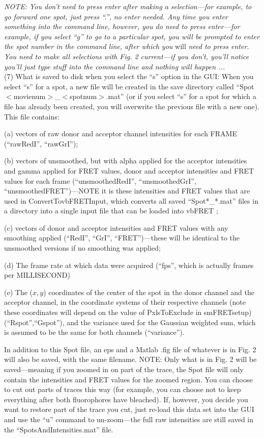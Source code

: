 \documentclass[11pt]{article}
\begin{document}
{\it NOTE: You don't need to press enter after making a selection---for example, to go forward one spot, just press ``.'', no enter needed.  Any time you enter something into the command line, however, you do need to press enter---for example, if you select ``g'' to go to a particular spot, you will be prompted to enter the spot number in the command line, after which you } will {\it need to press enter.  You need to make all selections with Fig. 2 current---if you don't, you'll notice you'll just type stuff into the command line and nothing will happen ... }\\

\noindent (7) What is saved to disk when you select the ``s''  option in the GUI: When you select ``s'' for a spot, a new file will be created in the save directory called ``Spot$<$movienum$>$\_$<$spotnum$>$.mat'' (or if you select ``s'' for a spot for which a file has already been created, you will overwrite the previous file with a new one).  This file contains: 

(a) vectors of raw donor and acceptor channel intensities for each FRAME (``rawRedI'', ``rawGrI''); 

(b) vectors of unsmoothed, but with alpha applied for the acceptor intensities and gamma applied for FRET values, donor and acceptor intensities and FRET values for each frame (``unsmoothedRedI'', ``unsmoothedGrI'', ``unsmoothedFRET'')---NOTE it is these intensities and FRET values that are used in ConvertTovbFRETInput, which converts all saved ``Spot*\_*.mat'' files in a directory into a single input file that can be loaded into vbFRET \cite{Bronson2009};

(c) vectors of donor and acceptor intensities and FRET values with any smoothing applied (``RedI'', ``GrI'', ``FRET'')---these will be identical to the unsmoothed versions if no smoothing was applied;

(d) The frame rate at which data were acquired (``fps'', which is actually frames per MILLISECOND)

(e) The ($x,y$) coordinates of the center of the spot in the donor channel and the acceptor channel, in the coordinate systems of their respective channels (note these coordinates will depend on the value of PxlsToExclude in smFRETsetup) (``Rspot'',``Gspot''), and the variance used for the Gaussian weighted sum, which is assumed to be the same for both channels (``variance'').

In addition to this Spot file, an eps and a Matlab .fig file of whatever is in Fig. 2 will also be saved, with the same filename.  NOTE: Only what is in Fig. 2 will be saved---meaning if you zoomed in on part of the trace, the Spot file will only contain the intensities and FRET values for the zoomed region.  You can choose to cut out parts of traces this way (for example, you can choose not to keep everything after both fluorophores have bleached).  If, however, you decide you want to restore part of the trace you cut, just re-load this data set into the GUI and use the ``u'' command to un-zoom---the full raw intensities are still saved in the ``SpotsAndIntensities.mat'' file.
\end{document}

